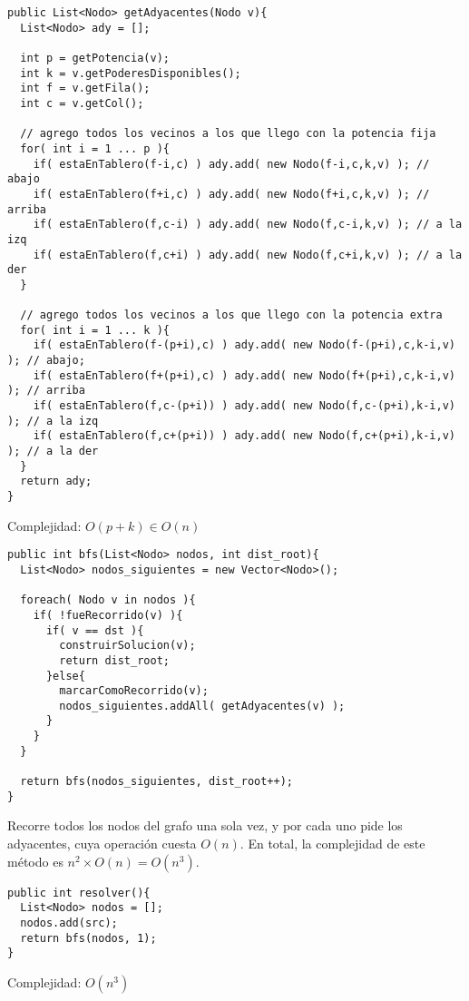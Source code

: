 \footnotesize\begin{verbatim}
public List<Nodo> getAdyacentes(Nodo v){
  List<Nodo> ady = [];

  int p = getPotencia(v);
  int k = v.getPoderesDisponibles();
  int f = v.getFila();
  int c = v.getCol();

  // agrego todos los vecinos a los que llego con la potencia fija
  for( int i = 1 ... p ){
    if( estaEnTablero(f-i,c) ) ady.add( new Nodo(f-i,c,k,v) ); // abajo
    if( estaEnTablero(f+i,c) ) ady.add( new Nodo(f+i,c,k,v) ); // arriba
    if( estaEnTablero(f,c-i) ) ady.add( new Nodo(f,c-i,k,v) ); // a la izq
    if( estaEnTablero(f,c+i) ) ady.add( new Nodo(f,c+i,k,v) ); // a la der
  }

  // agrego todos los vecinos a los que llego con la potencia extra
  for( int i = 1 ... k ){
    if( estaEnTablero(f-(p+i),c) ) ady.add( new Nodo(f-(p+i),c,k-i,v) ); // abajo;
    if( estaEnTablero(f+(p+i),c) ) ady.add( new Nodo(f+(p+i),c,k-i,v) ); // arriba
    if( estaEnTablero(f,c-(p+i)) ) ady.add( new Nodo(f,c-(p+i),k-i,v) ); // a la izq
    if( estaEnTablero(f,c+(p+i)) ) ady.add( new Nodo(f,c+(p+i),k-i,v) ); // a la der
  }
  return ady;
}
\end{verbatim}\normalsize

Complejidad: $O(p+k) \in O(n)$

\footnotesize\begin{verbatim}
public int bfs(List<Nodo> nodos, int dist_root){
  List<Nodo> nodos_siguientes = new Vector<Nodo>();

  foreach( Nodo v in nodos ){
    if( !fueRecorrido(v) ){
      if( v == dst ){
        construirSolucion(v);
        return dist_root;
      }else{
        marcarComoRecorrido(v);
        nodos_siguientes.addAll( getAdyacentes(v) );
      }
    }
  }

  return bfs(nodos_siguientes, dist_root++);
}
\end{verbatim}\normalsize

Recorre todos los nodos del grafo una sola vez, y por cada uno pide los adyacentes, cuya operaci\'on cuesta $O(n)$. En total, la complejidad de este m\'etodo es $n^2 \times O(n) = O(n^3)$.  

\footnotesize\begin{verbatim}
public int resolver(){
  List<Nodo> nodos = [];
  nodos.add(src);
  return bfs(nodos, 1);
}
\end{verbatim}\normalsize

Complejidad: $O(n^3)$

